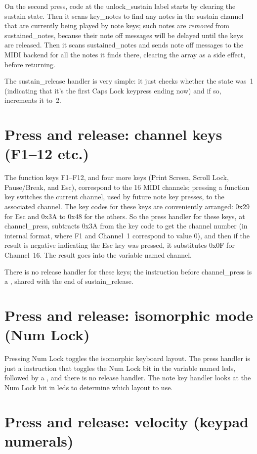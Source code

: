 On the second press, code at the unlock\_sustain label starts by clearing
the sustain state.  Then it scans key\_notes to find any notes in the
sustain channel that are currently being played by note keys; such notes are
\emph{removed} from sustained\_notes, because their note off messages will
be delayed until the keys are released.  Then it scans sustained\_notes and
sends note off messages to the MIDI backend for all the notes it finds
there, clearing the array as a side effect, before returning.

The sustain\_release handler is very simple:  it just checks whether the
state was~1 (indicating that it's the first Caps Lock keypress ending now)
and if so, increments it to~2.

\section{Press and release:  channel keys (F1--12 etc.)}

The function keys F1--F12, and four more keys (Print Screen, Scroll Lock,
Pause/Break, and Esc), correspond to the 16 MIDI channels; pressing a
function key switches the current channel, used by future note key presses,
to the associated channel.  The key codes for these keys are conveniently
arranged: 0x29 for Esc and 0x3A to 0x48 for the others.  So the press
handler for these keys, at channel\_press, subtracts 0x3A from the key code
to get the channel number (in internal format, where F1 and Channel~1
correspond to value 0), and then if the result is negative indicating the
Esc key was pressed, it substitutes 0x0F for Channel~16.  The result goes
into the variable named channel.

There is no release handler for these keys; the instruction before
channel\_press is a , shared with the end of sustain\_release.

\section{Press and release:  isomorphic mode (Num Lock)}

Pressing Num Lock toggles the isomorphic keyboard layout.  The press handler
is just a  instruction that toggles the Num Lock bit in the
variable named leds, followed by a , and there is no release
handler.  The note key handler looks at the Num Lock bit in leds to
determine which layout to use.

\section{Press and release:  velocity (keypad numerals)}

